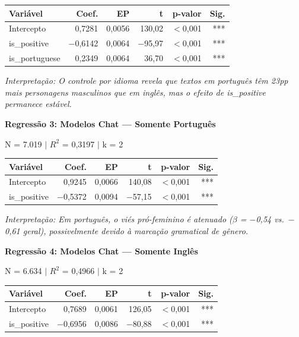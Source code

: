 \documentclass[12pt,a4paper]{article}
\begin{document}
\begin{table}[H]
\centering
\begin{tabular}{lrrrrr}
\toprule
\textbf{Variável} & \textbf{Coef.} & \textbf{EP} & \textbf{t} & \textbf{p-valor} & \textbf{Sig.} \\
\midrule
Intercepto & 0,7281 & 0,0056 & 130,02 & $<$0,001 & *** \\
is\_positive & $-$0,6142 & 0,0064 & $-$95,97 & $<$0,001 & *** \\
is\_portuguese & 0,2349 & 0,0064 & 36,70 & $<$0,001 & *** \\
\bottomrule
\end{tabular}
\end{table}

\noindent\textit{Interpretação: O controle por idioma revela que textos em português têm
23pp mais personagens masculinos que em inglês, mas o efeito de
is\_positive permanece estável.}

\vspace{0.5cm}
\noindent\textbf{Regressão 3: Modelos Chat --- Somente Português}

\noindent N = 7.019 $|$ $R^2$ = 0,3197 $|$ k = 2

\begin{table}[H]
\centering
\begin{tabular}{lrrrrr}
\toprule
\textbf{Variável} & \textbf{Coef.} & \textbf{EP} & \textbf{t} & \textbf{p-valor} & \textbf{Sig.} \\
\midrule
Intercepto & 0,9245 & 0,0066 & 140,08 & $<$0,001 & *** \\
is\_positive & $-$0,5372 & 0,0094 & $-$57,15 & $<$0,001 & *** \\
\bottomrule
\end{tabular}
\end{table}

\noindent\textit{Interpretação: Em português, o viés pró-feminino é atenuado ($\beta$ = $-$0,54
vs.\ $-$0,61 geral), possivelmente devido à marcação gramatical de gênero.}

\vspace{0.5cm}
\noindent\textbf{Regressão 4: Modelos Chat --- Somente Inglês}

\noindent N = 6.634 $|$ $R^2$ = 0,4966 $|$ k = 2

\begin{table}[H]
\centering
\begin{tabular}{lrrrrr}
\toprule
\textbf{Variável} & \textbf{Coef.} & \textbf{EP} & \textbf{t} & \textbf{p-valor} & \textbf{Sig.} \\
\midrule
Intercepto & 0,7689 & 0,0061 & 126,05 & $<$0,001 & *** \\
is\_positive & $-$0,6956 & 0,0086 & $-$80,88 & $<$0,001 & *** \\
\bottomrule
\end{tabular}
\end{table}
\end{document}
